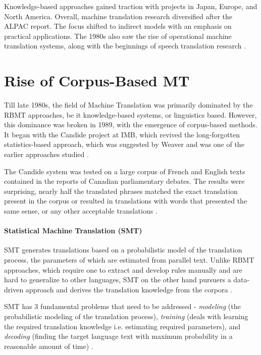 Knowledge-based approaches gained traction with projects in Japan, Europe, and North America. Overall, machine translation research diversified after the ALPAC report. The focus shifted to indirect models with an emphasis on practical applications. The 1980s also saw the rise of operational machine translation systems, along with the beginnings of speech translation research \cite{hutchins2023machine}.

\section{Rise of Corpus-Based MT}

Till late 1980s, the field of Machine Translation was primarily dominated by the RBMT approaches, be it knowledge-based systems, or linguistics based. However, this dominance was broken in 1989, with the emergence of corpus-based methods. It began with the Candide project at IMB, which revived the long-forgotten statistics-based approach, which was suggested by Weaver and was one of the earlier approaches studied \cite{yang2014statistical} \cite{hutchins2023machine}. 

The Candide system was tested on a large corpus of French and English texts contained in the reports of Canadian parliamentary debates. The results were surprising, nearly half the translated phrases matched the exact translation present in the corpus or resulted in translations with words that presented the same sense, or any other acceptable translations \cite{berger1994candide} \cite{hutchins2023machine}.

\paragraph{Statistical Machine Translation (SMT)}
SMT generates translations based on a probabilistic model of the translation process, the parameters of which are estimated from parallel text. Unlike RBMT approaches, which require one to extract and develop rules manually and are hard to generalize to other languages, SMT on the other hand pursuers a data-driven approach and derives the translation knowledge from the corpora \cite{yang2014statistical}.

SMT has 3 fundamental problems that need to be addressed - \textit{modeling} (the probabilistic modeling of the translation process), \textit{training} (deals with learning the required translation knowledge i.e. estimating required parameters), and \textit{decoding} (finding the target language text with maximum probability in a reasonable amount of time) \cite{yang2014statistical}.


